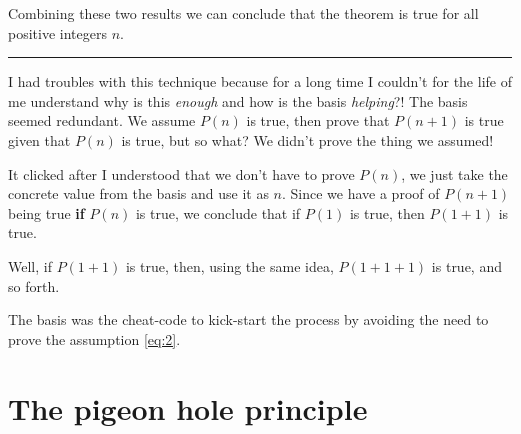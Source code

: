 \documentclass[12pt, a4paper, justified, notitlepage, sfsidenotes, notoc]{book}
\begin{document}
Combining these two results we can conclude that the theorem is true for all positive integers \(n\).

\noindent\rule{\textwidth}{0.5pt}

I had troubles with this technique because for a long time I couldn't for the life of me understand why is this \emph{enough} and how is the basis \emph{helping}?! The basis seemed redundant. We assume \(P(n)\) is true, then prove that \(P(n+1)\) is true given that \(P(n)\) is true, but so what? We didn't prove the thing we assumed!

It clicked after I understood that we don't have to prove \(P(n)\), we just take the concrete value from the basis and use it as \(n\). Since we have a proof of \(P(n+1)\) being true \textbf{if} \(P(n)\) is true, we conclude that if \(P(1)\) is true, then \(P(1+1)\) is true.

Well, if \(P(1+1)\) is true, then, using the same idea, \(P(1+1+1)\) is true, and so forth.

The basis was the cheat-code to kick-start the process by avoiding the need to prove the assumption \ref{eq:2}.

\section{The pigeon hole principle}
\label{sec:org2d96568}
\end{document}
